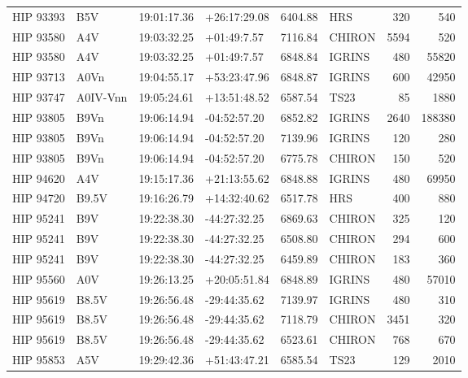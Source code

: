 \documentclass{emulateapj}
\begin{document}
\begin{longtable*}{|l|lllrlrr|}
   HIP 93393 &            B5V &    19:01:17.36 &   +26:17:29.08 &  6404.88 &        HRS &      320 &     540 \\
   HIP 93580 &            A4V &    19:03:32.25 &    +01:49:7.57 &  7116.84 &     CHIRON &     5594 &     520 \\
   HIP 93580 &            A4V &    19:03:32.25 &    +01:49:7.57 &  6848.84 &     IGRINS &      480 &   55820 \\
   HIP 93713 &           A0Vn &    19:04:55.17 &   +53:23:47.96 &  6848.87 &     IGRINS &      600 &   42950 \\
   HIP 93747 &       A0IV-Vnn &    19:05:24.61 &   +13:51:48.52 &  6587.54 &       TS23 &       85 &    1880 \\
   HIP 93805 &           B9Vn &    19:06:14.94 &   -04:52:57.20 &  6852.82 &     IGRINS &     2640 &  188380 \\
   HIP 93805 &           B9Vn &    19:06:14.94 &   -04:52:57.20 &  7139.96 &     IGRINS &      120 &     280 \\
   HIP 93805 &           B9Vn &    19:06:14.94 &   -04:52:57.20 &  6775.78 &     CHIRON &      150 &     520 \\
   HIP 94620 &            A4V &    19:15:17.36 &   +21:13:55.62 &  6848.88 &     IGRINS &      480 &   69950 \\
   HIP 94720 &          B9.5V &    19:16:26.79 &   +14:32:40.62 &  6517.78 &        HRS &      400 &     880 \\
   HIP 95241 &            B9V &    19:22:38.30 &   -44:27:32.25 &  6869.63 &     CHIRON &      325 &     120 \\
   HIP 95241 &            B9V &    19:22:38.30 &   -44:27:32.25 &  6508.80 &     CHIRON &      294 &     600 \\
   HIP 95241 &            B9V &    19:22:38.30 &   -44:27:32.25 &  6459.89 &     CHIRON &      183 &     360 \\
   HIP 95560 &            A0V &    19:26:13.25 &   +20:05:51.84 &  6848.89 &     IGRINS &      480 &   57010 \\
   HIP 95619 &          B8.5V &    19:26:56.48 &   -29:44:35.62 &  7139.97 &     IGRINS &      480 &     310 \\
   HIP 95619 &          B8.5V &    19:26:56.48 &   -29:44:35.62 &  7118.79 &     CHIRON &     3451 &     320 \\
   HIP 95619 &          B8.5V &    19:26:56.48 &   -29:44:35.62 &  6523.61 &     CHIRON &      768 &     670 \\
   HIP 95853 &            A5V &    19:29:42.36 &   +51:43:47.21 &  6585.54 &       TS23 &      129 &    2010 \\

\end{longtable*}
\end{document}
